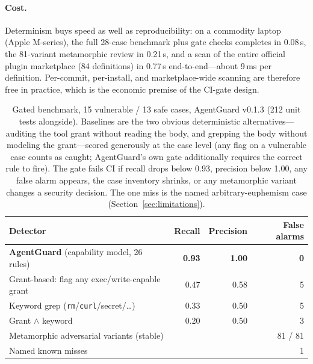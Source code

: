 \documentclass[11pt]{article}
\begin{document}
\paragraph{Cost.}
Determinism buys speed as well as reproducibility: on a commodity laptop (Apple M-series), the
full 28-case benchmark plus gate checks completes in 0.08\,s, the 81-variant metamorphic review in
0.21\,s, and a scan of the entire official plugin marketplace (84 definitions) in 0.77\,s
end-to-end---about 9\,ms per definition. Per-commit, per-install, and marketplace-wide scanning
are therefore free in practice, which is the economic premise of the CI-gate design.

\begin{table}[h]
\centering
\begin{tabular}{lrrr}
\toprule
Detector & Recall & Precision & False alarms \\
\midrule
\textbf{AgentGuard} (capability model, 26 rules) & \textbf{0.93} & \textbf{1.00} & \textbf{0} \\
Grant-based: flag any exec/write-capable grant & 0.47 & 0.58 & 5 \\
Keyword grep (\texttt{rm}/\texttt{curl}/secret/\ldots) & 0.33 & 0.50 & 5 \\
Grant $\wedge$ keyword & 0.20 & 0.50 & 3 \\
\midrule
Metamorphic adversarial variants (stable) & \multicolumn{3}{r}{81 / 81} \\
Named known misses & \multicolumn{3}{r}{1} \\
\bottomrule
\end{tabular}
\caption{Gated benchmark, 15 vulnerable / 13 safe cases, AgentGuard v0.1.3 (212 unit tests
alongside). Baselines are the two obvious deterministic alternatives---auditing the tool grant
without reading the body, and grepping the body without modeling the grant---scored generously at
the case level (any flag on a vulnerable case counts as caught; AgentGuard's own gate additionally
requires the correct rule to fire). The gate fails CI if recall drops below 0.93, precision below
1.00, any false alarm appears, the case inventory shrinks, or any metamorphic variant changes a
security decision. The one miss is the named arbitrary-euphemism case
(Section~\ref{sec:limitations}).}
\label{tab:benchmark}
\end{table}
\end{document}
